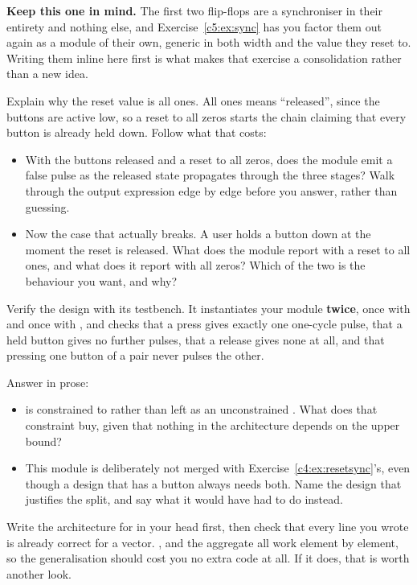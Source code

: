 \textbf{Keep this one in mind.} The first two flip-flops are a synchroniser in their entirety and
nothing else, and Exercise~\ref{c5:ex:sync} has you factor them out again as a module of their own,
generic in both width and the value they reset to. Writing them inline here first is what makes that
exercise a consolidation rather than a new idea.

 Explain why the reset value is all ones. All ones means ``released'', since the buttons
are active low, so a reset to all zeros starts the chain claiming that every button is already held
down. Follow what that costs:
\begin{itemize}
  \item With the buttons released and a reset to all zeros, does the module emit a false pulse as
    the released state propagates through the three stages? Walk through the output expression edge
    by edge before you answer, rather than guessing.
  \item Now the case that actually breaks. A user holds a button down at the moment the reset is
    released. What does the module report with a reset to all ones, and what does it report with all
    zeros? Which of the two is the behaviour you want, and why?
\end{itemize}

 Verify the design with its testbench. It instantiates your module \textbf{twice}, once
with  and once with , and checks that a press gives exactly one
one-cycle pulse, that a held button gives no further pulses, that a release gives none at all, and
that pressing one button of a pair never pulses the other.

 Answer in prose:
\begin{itemize}
  \item {} is constrained to  rather than left as an unconstrained
    . What does that constraint buy, given that nothing in the architecture depends on
    the upper bound?
  \item This module is deliberately not merged with Exercise~\ref{c4:ex:resetsync}'s, even though a
    design that has a button always needs both. Name the design that justifies the split, and say
    what it would have had to do instead.
\end{itemize}

\note[Hint]Write the architecture for  in your head first, then check that every
line you wrote is already correct for a vector. ,  and the aggregate
 all work element by element, so the generalisation should cost you no extra
code at all. If it does, that is worth another look.


